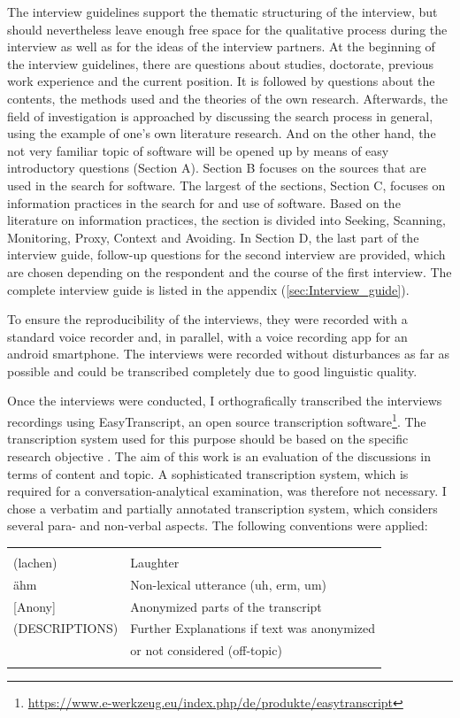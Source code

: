\documentclass[12pt,a4paper,titlepage,oneside,abstract=true,toc=listof,toc=bibliography]{scrreprt}
\begin{document}
The interview guidelines support the thematic structuring of the interview, but should nevertheless leave enough free space for the qualitative process during the interview as well as for the ideas of the interview partners. At the beginning of the interview guidelines, there are questions about studies, doctorate, previous work experience and the current position. It is followed by questions about the contents, the methods used and the theories of the own research. Afterwards, the field of investigation is approached by discussing the search process in general, using the example of one's own literature research. And on the other hand, the not very familiar topic of software will be opened up by means of easy introductory questions (Section A).  Section B focuses on the sources that are used in the search for software. The largest of the sections, Section C, focuses on information practices in the search for and use of software. Based on the literature on information practices, the section is divided into Seeking, Scanning, Monitoring, Proxy, Context and Avoiding. In Section D, the last part of the interview guide, follow-up questions for the second interview are provided, which are chosen depending on the respondent and the course of the first interview. The complete interview guide is listed in the appendix (\ref{sec:Interview_guide}).

To ensure the reproducibility of the interviews, they were recorded with a standard voice recorder and, in parallel, with a voice recording app for an android smartphone. The interviews were recorded without disturbances as far as possible and could be transcribed completely due to good linguistic quality.

Once the interviews were conducted, I orthografically transcribed the interviews recordings using EasyTranscript, an open source transcription software\footnote{\url{https://www.e-werkzeug.eu/index.php/de/produkte/easytranscript}}. The transcription system used for this purpose should be based on the specific research objective \citep{Edwards2003}. The aim of this work is an evaluation of the discussions in terms of content and topic. A sophisticated transcription system, which is required for a conversation-analytical examination, was therefore not necessary. I chose a verbatim and partially annotated transcription system, which considers several para- and non-verbal aspects. The following conventions were applied:

\small
\begin{tabular}{ll}
 & \\
 	(lachen) & Laughter\\
 	ähm	& Non-lexical utterance (uh, erm, um)\\
 	{[Anony]} & Anonymized parts of the transcript\\
	(DESCRIPTIONS)	& Further Explanations if text was anonymized\\
	               & or not considered (off-topic)\\
 & \\
\end{tabular}
\normalsize
\end{document}
